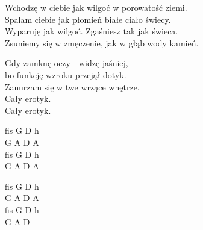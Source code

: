 \begin{text}
    Wchodzę w ciebie jak wilgoć w porowatość ziemi.\\
    Spalam ciebie jak płomień białe ciało świecy.\\
    Wyparuję jak wilgoć. Zgaśniesz tak jak świeca.\\
    Zsuniemy się w zmęczenie, jak w głąb wody kamień.

    Gdy zamknę oczy - widzę jaśniej,\\
    bo funkcję wzroku przejął dotyk.\\
    Zanurzam się w twe wrzące wnętrze.\\
    Cały erotyk.\\
    Cały erotyk.
\end{text}
\begin{chord}
    fis G D h\\
    G A D A\\
    fis G D h\\
    G A D A

    fis G D h\\
    G A D A\\
    fis G D h\\
    G A D
\end{chord}